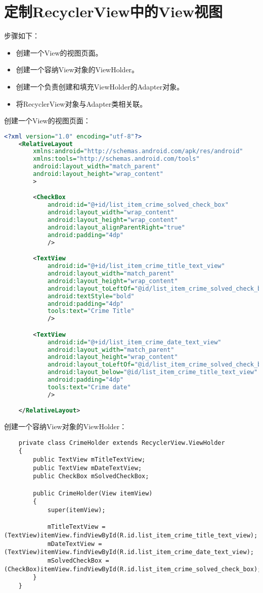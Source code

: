 \documentclass[a4paper,left=2.5cm,right=2.5cm,11pt]{article}
\begin{document}


\section{定制RecyclerView中的View视图}
	步骤如下：
	\begin{itemize}
		\item 创建一个View的视图页面。
		\item 创建一个容纳View对象的ViewHolder。
		\item 创建一个负责创建和填充ViewHolder的Adapter对象。
		\item 将RecyclerView对象与Adapter类相关联。
	\end{itemize}

	创建一个View的视图页面：
	\begin{lstlisting}[language = xml]
	<?xml version="1.0" encoding="utf-8"?>
	<RelativeLayout
		xmlns:android="http://schemas.android.com/apk/res/android"
		xmlns:tools="http://schemas.android.com/tools"
		android:layout_width="match_parent"
		android:layout_height="wrap_content"
		>

		<CheckBox
			android:id="@+id/list_item_crime_solved_check_box"
			android:layout_width="wrap_content"
			android:layout_height="wrap_content"
			android:layout_alignParentRight="true"
			android:padding="4dp"
			/>

		<TextView
			android:id="@+id/list_item_crime_title_text_view"
			android:layout_width="match_parent"
			android:layout_height="wrap_content"
			android:layout_toLeftOf="@id/list_item_crime_solved_check_box"
			android:textStyle="bold"
			android:padding="4dp"
			tools:text="Crime Title"
			/>

		<TextView
			android:id="@+id/list_item_crime_date_text_view"
			android:layout_width="match_parent"
			android:layout_height="wrap_content"
			android:layout_toLeftOf="@id/list_item_crime_solved_check_box"
			android:layout_below="@id/list_item_crime_title_text_view"
			android:padding="4dp"
			tools:text="Crime date"
			/>

	</RelativeLayout>
	\end{lstlisting}

	创建一个容纳View对象的ViewHolder：
	\begin{lstlisting}
	private class CrimeHolder extends RecyclerView.ViewHolder
	{
		public TextView mTitleTextView;
		public TextView mDateTextView;
		public CheckBox mSolvedCheckBox;

		public CrimeHolder(View itemView)
		{
			super(itemView);

			mTitleTextView = (TextView)itemView.findViewById(R.id.list_item_crime_title_text_view);
			mDateTextView = (TextView)itemView.findViewById(R.id.list_item_crime_date_text_view);
			mSolvedCheckBox = (CheckBox)itemView.findViewById(R.id.list_item_crime_solved_check_box);
		}
	}
	\end{lstlisting}
\end{document}
